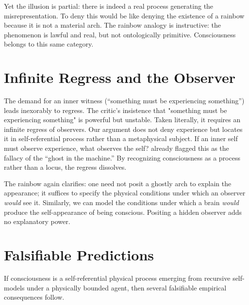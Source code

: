 \documentclass[12pt]{article}
\begin{document}
Yet the illusion is partial: there is indeed a real process generating the misrepresentation. 
To deny this would be like denying the existence of a rainbow because it is not a material arch. 
The rainbow analogy \parencite{Dennett1991,Blackmore2004} is instructive: 
the phenomenon is lawful and real, but not ontologically primitive. Consciousness belongs to this same category. 

\section{Infinite Regress and the Observer}

The demand for an inner witness (``something must be experiencing something'') leads inexorably to regress. 
The critic's insistence that "something must be experiencing 
something" is powerful but unstable. Taken literally, it requires 
an infinite regress of observers. Our argument does not deny 
experience but locates it in self-referential process rather 
than a metaphysical subject.
If an inner self must observe experience, what observes the self? 
\textcite{Ryle1949} already flagged this as the fallacy of the ``ghost in the machine.'' 
By recognizing consciousness as a process rather than a locus, the regress dissolves. 

The rainbow again clarifies: one need not posit a ghostly arch to explain the appearance; 
it suffices to specify the physical conditions under which an observer \emph{would} see it. 
Similarly, we can model the conditions under which a brain \emph{would} 
produce the self-appearance of being conscious.
Positing a hidden observer adds no explanatory power.

\section*{Falsifiable Predictions}

If consciousness is a self-referential physical process
emerging from recursive self-models under a physically bounded agent, 
then several falsifiable empirical consequences follow.
\end{document}
